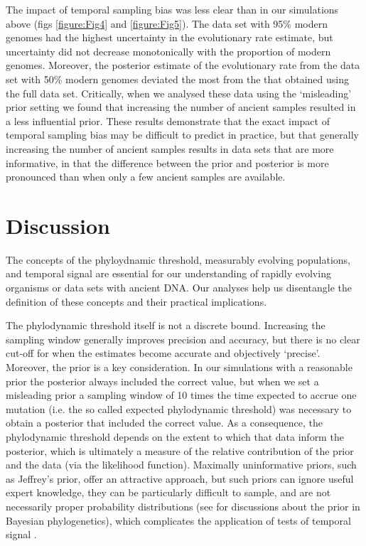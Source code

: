 \documentclass[11pt]{article}
\begin{document}
The impact of temporal sampling bias was less clear than in our simulations above (figs \ref{figure:Fig4} and \ref{figure:Fig5}). The data set with 95\% modern genomes had the highest uncertainty in the evolutionary rate estimate, but uncertainty did not decrease monotonically with the proportion of modern genomes. Moreover, the posterior estimate of the evolutionary rate from the data set with 50\% modern genomes deviated the most from the that obtained using the full data set. Critically, when we analysed these data using the `misleading' prior setting we found that increasing the number of ancient samples resulted in a less influential prior. These results demonstrate that the exact impact of temporal sampling bias may be difficult to predict in practice, but that generally increasing the number of ancient samples results in data sets that are more informative, in that the difference between the prior and posterior is more pronounced than when only a few ancient samples are available.

\section{Discussion}
The concepts of the phyloydnamic threshold, measurably evolving populations, and temporal signal are essential for our understanding of rapidly evolving organisms or data sets with ancient DNA. Our analyses help us disentangle the definition of these concepts and their practical implications. 

The phylodynamic threshold itself is not a discrete bound. Increasing the sampling window generally improves precision and accuracy, but there is no clear cut-off for when the estimates become accurate and objectively `precise'. Moreover, the prior is a key consideration. In our simulations with a reasonable prior the posterior always included the correct value, but when we set a misleading prior a sampling window of 10 times the time expected to accrue one mutation (i.e. the so called expected phylodynamic threshold) was necessary to obtain a posterior that included the correct value. As a consequence, the phylodynamic threshold depends on the extent to which that data inform the posterior, which is ultimately a measure of the relative contribution of the prior and the data (via the likelihood function). Maximally uninformative priors, such as Jeffrey's prior, offer an attractive approach, but such priors can ignore useful expert knowledge, they can be particularly difficult to sample, and are not necessarily proper probability distributions (see \citealt{baele2014bayesian, wang2014priors} for discussions about the prior in Bayesian phylogenetics), which complicates the application of tests of temporal signal \citep{duchene2020bayesian}. 
\end{document}

